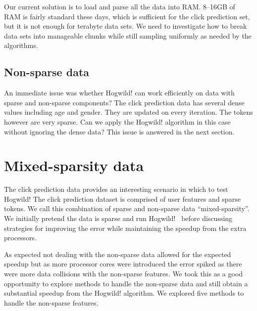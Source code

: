 \documentclass{article} %
\begin{document}
Our current solution is to load and parse all the data into RAM. 8--16GB of RAM is fairly standard these days, which is sufficient for the click prediction set, but it is not enough for terabyte data sets. We need to investigate how to break data sets into manageable chunks while still sampling uniformly as needed by the algorithms. 

\subsection{Non-sparse data}
An immediate issue was whether Hogwild! can work efficiently on data with sparse and non-sparse components? The click prediction data has several dense values including age and gender. They are updated on every iteration. The tokens however are very sparse. Can we apply the Hogwild! algorithm in this case without ignoring the dense data? This issue is answered in the next section.

\section{Mixed-sparsity data}
The click prediction data provides an interesting scenario in which to test Hogwild! The click prediction dataset is comprised of user features and sparse tokens. We call this combination of sparse and non-sparse data ``mixed-sparsity''. We initially pretend the data is sparse and run Hogwild!~ before discussing strategies for improving the error while maintaining the speedup from the extra processors.

As expected not dealing with the non-sparse data allowed for the expected speedup but as more processor cores were introduced the error spiked as there were more data collisions with the non-sparse features. We took this as a good opportunity to explore methods to handle the non-sparse data and still obtain a substantial speedup from the Hogwild! algorithm.  We explored five methods to handle the non-sparse features.
\end{document}
